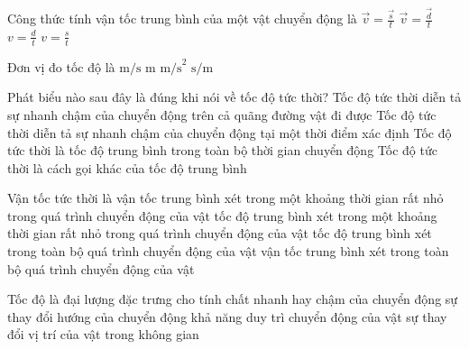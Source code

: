 \begin{ex} Công thức tính vận tốc trung bình của một vật chuyển động là
\choice
{$\vec{v} = \frac{\vec{s}}{t}$}
{\True $\vec{v} = \frac{\vec{d}}{t}$}
{$v = \frac{d}{t}$}
{$v = \frac{s}{t}$}
\end{ex}

\begin{ex} Đơn vị đo tốc độ là
\choice
{\True $\text{m/s}$}
{$\text{m}$}
{$\text{m/s}^2$}
{$\text{s/m}$}
\end{ex}

\begin{ex} Phát biểu nào sau đây là đúng khi nói về tốc độ tức thời?
\choice
{Tốc độ tức thời diễn tả sự nhanh chậm của chuyển động trên cả quãng đường vật đi được}
{\True Tốc độ tức thời diễn tả sự nhanh chậm của chuyển động tại một thời điểm xác định}
{Tốc độ tức thời là tốc độ trung bình trong toàn bộ thời gian chuyển động}
{Tốc độ tức thời là cách gọi khác của tốc độ trung bình}
\end{ex}

\begin{ex} Vận tốc tức thời là
\choice
{\True vận tốc trung bình xét trong một khoảng thời gian rất nhỏ trong quá trình chuyển động của vật}
{tốc độ trung bình xét trong một khoảng thời gian rất nhỏ trong quá trình chuyển động của vật}
{tốc độ trung bình xét trong toàn bộ quá trình chuyển động của vật}
{vận tốc trung bình xét trong toàn bộ quá trình chuyển động của vật}
\end{ex}

\begin{ex} Tốc độ là đại lượng đặc trưng cho
\choice
{\True tính chất nhanh hay chậm của chuyển động}
{sự thay đổi hướng của chuyển động}
{khả năng duy trì chuyển động của vật}
{sự thay đổi vị trí của vật trong không gian}
\end{ex}

